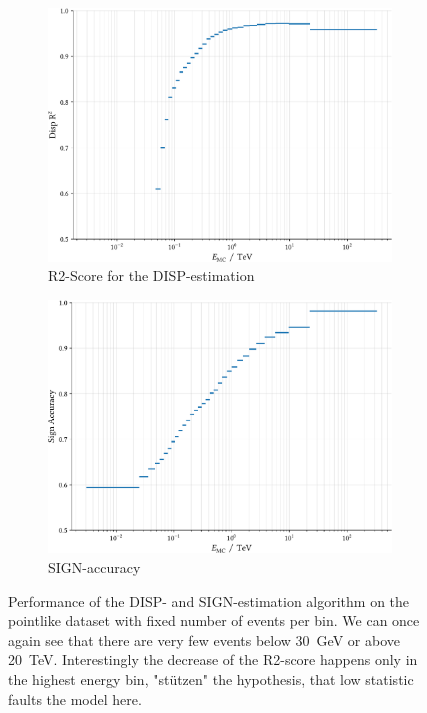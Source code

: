 \begin{figure}
    \begin{subfigure}{0.45\textwidth}
        \includegraphics[width=0.9\linewidth]{../analysis/plots/disp_gamma_r2_equal_filled.pdf} 
        \caption{R2-Score for the DISP-estimation}
    \end{subfigure}
    \begin{subfigure}{0.45\textwidth}
        \includegraphics[width=0.9\linewidth]{../analysis/plots/disp_gamma_acc_equal_filled.pdf}
        \caption{SIGN-accuracy}
    \end{subfigure}
    \caption{
	Performance of the DISP- and SIGN-estimation algorithm on the pointlike dataset
	with fixed number of events per bin. We can once again see that there are very few events below
	\SI{30}{\giga\electronvolt} or above \SI{20}{\tera\electronvolt}.
	Interestingly the decrease of the R2-score happens only in the 
	highest energy bin, "stützen" the hypothesis, that low statistic faults the model here.
    	}
    \label{fig:disp_gamma_perf_2}
\end{figure}



